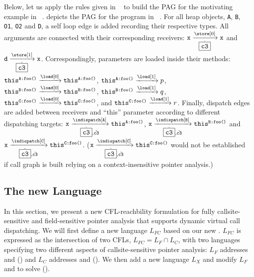 Below, let us apply the rules given in ~ to build the PAG for the motivating example in ~.
 depicts the PAG for the program in ~. 
For all heap objects, \texttt{A}, \texttt{B}, \texttt{O1}, \texttt{O2} and \texttt{D}, 
a self loop edge is added recording their respective types. 
All arguments are connected with their corresponding receivers:
$\texttt{x}\xrightarrow[\hat{\boxed{\texttt{c3}}}]{\store[0]}\texttt{x}$ and
$\texttt{d}\xrightarrow[\hat{\boxed{\texttt{c3}}}]{\store[1]}\texttt{x}$. Correspondingly, 
parameters are loaded inside their methods:
$\texttt{this}^\texttt{A:foo()}\xrightarrow{\load[0]}\texttt{this}^\texttt{A:foo()}$,
$\texttt{this}^\texttt{A:foo()} \linebreak \xrightarrow{\load[1]}p$,
$\texttt{this}^\texttt{B:foo()}\xrightarrow{\load[0]}\texttt{this}^\texttt{B:foo()}$,
$\texttt{this}^\texttt{B:foo()}\xrightarrow{\load[1]}q$,
$\texttt{this}^\texttt{C:foo()}\xrightarrow{\load[0]}\texttt{this}^\texttt{C:foo()}$, and
$\texttt{this}^\texttt{C:foo()}\xrightarrow{\load[1]}r$. Finally, dispatch edges are added
between receivers and ``this'' parameter according to different dispatching targets:
$\texttt{x}\xrightarrow[\hat{\boxed{\texttt{c3}}}, \hat{\texttt{c3}}]{\indispatch[\mathtt{A}]}\texttt{this}^\texttt{A:foo()}$,
$\texttt{x}\xrightarrow[\hat{\boxed{\texttt{c3}}}, \hat{\texttt{c3}}]{\indispatch[\mathtt{B}]}\texttt{this}^\texttt{B:foo()}$ and
$\texttt{x}\xrightarrow[\hat{\boxed{\texttt{c3}}}, \hat{\texttt{c3}}]{\indispatch[\mathtt{C}]}\texttt{this}^\texttt{C:foo()}$.
($\texttt{x}\xrightarrow[\hat{\boxed{\texttt{c3}}}, \hat{\texttt{c3}}]{\indispatch[\mathtt{C}]}\texttt{this}^\texttt{C:foo()}$ 
would not be established if call graph is built relying on a context-insensitive pointer analysis.)


\subsection{The new Language}
\label{subsec:newCFLs}

In this section, we present a new CFL-reachbility formulation for fully  
callsite-sensitive and field-sensitive pointer analysis that supports 
dynamic virtual call dispatching. 
We will first define a new language $L_{FC}$ based on our new \pag. $L_{FC}$ 
is expressed as the intersection of two CFLs, $L_{FC} = L_F \cap L_C$, 
with two languages specifying two
different aspects of callsite-sensitive pointer analysis: $L_F$ 
addresses  and  () 
and $L_C$ addresses  and  (). We then add a new language $L_X$ and
modify $L_F$ and \pag to solve  (). 

